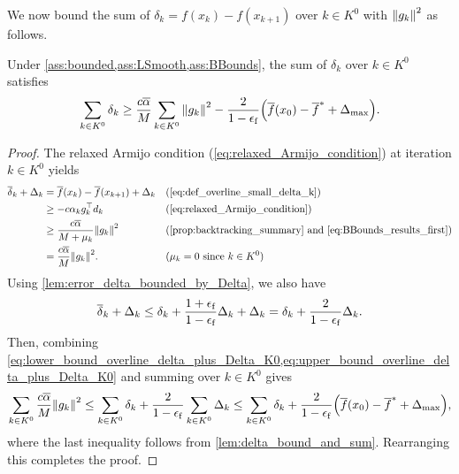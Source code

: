 \documentclass[journal_revised_MPC]{subfiles}
\begin{document}
We now bound the sum of $\delta_k = f(x_k) - f(x_{k+1})$ over $k \in K^0$ with $\norm{g_{k}}^2$ as follows.
\begin{lemma}\label{lem:sum_small_delta_k_bound_K0}
    Under \cref{ass:bounded,ass:LSmooth,ass:BBounds}, the sum of $\delta_k$ over $k \in K^0$ satisfies
    \begin{equation*}
        \sum_{k \in K^0} \delta_{k} \geq \frac{c \overline{\alpha}}{M} \sum_{k \in K^0} \norm{g_{k}}^2 - \frac{2}{1-\epsilon_\mathrm{f}} \qty(\overline{f}(x_0) - \overline{f}^* + \Delta_{\max}).
    \end{equation*}
\end{lemma}
\begin{proof}
    The relaxed Armijo condition (\cref{eq:relaxed_Armijo_condition}) at iteration $k \in K^0$ yields
    \begin{align}
        \overline{\delta}_{k} + \Delta_{k}
         & = \overline{f}(x_{k}) - \overline{f}(x_{k+1}) + \Delta_{k} &  & (\text{\cref{eq:def_overline_small_delta_k}})                                   \notag     \\
         & \ge -c \alpha_{k} g_{k}^\top d_{k}                         &  & (\text{\cref{eq:relaxed_Armijo_condition}}) \notag                                         \\
         & \ge \frac{c \overline{\alpha}}{M+\mu_{k}} \norm{g_{k}}^2   &  & (\text{\cref{prop:backtracking_summary} and \cref{eq:BBounds_results_first}})\notag        \\
         & = \frac{c \overline{\alpha}}{M} \norm{g_{k}}^2.            &  & (\mu_{k} = 0 \text{ since } k \in K^0) \label{eq:lower_bound_overline_delta_plus_Delta_K0}
    \end{align}
    Using \cref{lem:error_delta_bounded_by_Delta}, we also have
    \begin{equation}
        \overline{\delta}_k + \Delta_{k} \le \delta_k + \frac{1+\epsilon_\mathrm{f}}{1-\epsilon_\mathrm{f}} \Delta_k + \Delta_k = \delta_k + \frac{2}{1-\epsilon_\mathrm{f}} \Delta_{k}. \label{eq:upper_bound_overline_delta_plus_Delta_K0}
    \end{equation}
    Then, combining \cref{eq:lower_bound_overline_delta_plus_Delta_K0,eq:upper_bound_overline_delta_plus_Delta_K0} and summing over $k \in K^0$ gives
    \begin{equation*}
        \sum_{k \in K^0} \frac{c \overline{\alpha}}{M} \norm{g_{k}}^2   \leq \sum_{k \in K^0} \delta_{k} + \frac{2}{1-\epsilon_\mathrm{f}} \sum_{k \in K^0} \Delta_{k}
        \leq \sum_{k \in K^0} \delta_{k} + \frac{2}{1-\epsilon_\mathrm{f}} \qty(\overline{f}(x_0) - \overline{f}^* + \Delta_{\max}),
    \end{equation*}
    where the last inequality follows from \cref{lem:delta_bound_and_sum}.
    Rearranging this completes the proof.
    \myQED
\end{proof}
\end{document}

